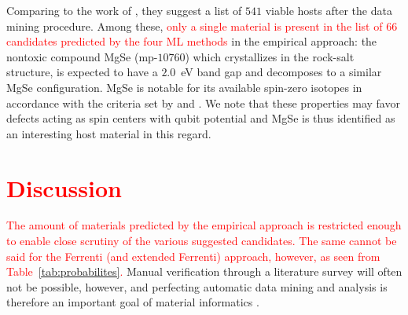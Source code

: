 \documentclass[superscriptaddress,unsortedaddress,
 amsmath,amssymb,
 aps,
]{revtex4-2}
\newcommand{\mrk}[1]{\textcolor{red}{#1}}
\begin{document}
Comparing to the work of \citeauthor{Ferrenti2020} \cite{Ferrenti2020}, they suggest a list of $541$ viable hosts after the data mining procedure.  
Among these, \mrk{only a single material is present in the list of $66$ candidates predicted by the four ML methods} in the empirical approach: the nontoxic compound MgSe (mp-$10760$) which crystallizes in the rock-salt structure, is expected to have a $2.0$~eV band gap and decomposes to a similar MgSe configuration. 
MgSe is notable for its available spin-zero isotopes in accordance with the criteria set by \citeauthor{Weber2010} \cite{Weber2010} and \citeauthor{Ferrenti2020} \cite{Ferrenti2020}. We note that these properties may favor defects acting as spin centers with qubit potential and MgSe is thus identified as an interesting host material in this regard.   

\section*{\mrk{Discussion}}
\mrk{The amount of materials predicted by the empirical approach is restricted enough to enable close scrutiny of the various suggested candidates. The same cannot be said for the Ferrenti (and extended Ferrenti) approach, however, as seen from Table~\ref{tab:probabilites}.} Manual verification through a literature survey will often not be possible, however, and perfecting automatic data mining and analysis is therefore an important goal of material informatics \cite{rickman2019}. 
\end{document}
